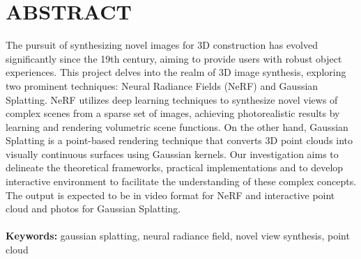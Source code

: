 \chapter*{ABSTRACT}

\begin{justify}
The pursuit of synthesizing novel images for 3D construction has evolved significantly since the 19th century, aiming to provide users with robust object experiences. This project delves into the realm of 3D image synthesis, exploring two prominent techniques: Neural Radiance Fields (NeRF) and Gaussian Splatting. NeRF utilizes deep learning techniques to synthesize novel views of complex scenes from a sparse set of images, achieving photorealistic results by learning and rendering volumetric scene functions. On the other hand, Gaussian Splatting is a point-based rendering technique that converts 3D point clouds into visually continuous surfaces using Gaussian kernels. Our investigation aims to delineate the theoretical frameworks, practical implementations and to develop interactive environment to facilitate the understanding of these complex concepts. The output is expected to be in video format for NeRF and interactive point cloud and photos for Gaussian Splatting.\\
\\
\noindent\textbf{Keywords:} gaussian splatting, neural radiance field, novel view synthesis, point cloud
\end{justify}
\newpage